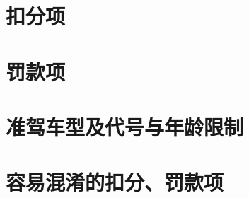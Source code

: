 \documentclass[b5paper]{ctexbook}
\title{\docname}
\author{\companyname}
\date{\today}
\begin{document}
    \maketitle

    \tableofcontents
    \fangsong
    \chapter{扣分项}
    

    \chapter{罚款项}
    

    \appendix
    
    \chapter{准驾车型及代号与年龄限制}
    

    \chapter{容易混淆的扣分、罚款项}
    
\end{document}
